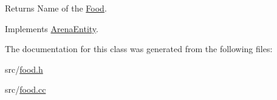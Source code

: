 \begin{DoxyReturn}{Returns}
Name of the \hyperlink{classFood}{Food}. 
\end{DoxyReturn}


Implements \hyperlink{classArenaEntity_ad43152003033cf01ad86eeff1990b69a}{Arena\+Entity}.



The documentation for this class was generated from the following files\+:\begin{DoxyCompactItemize}
\item 
src/\hyperlink{food_8h}{food.\+h}\item 
src/\hyperlink{food_8cc}{food.\+cc}\end{DoxyCompactItemize}
